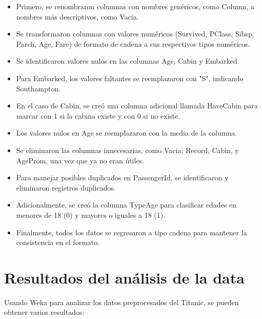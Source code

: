 \documentclass[12pt]{article}
\begin{document}
        \begin{itemize}
            \item Primero, se renombraron columnas con nombres genéricos, como Column, a nombres más descriptivos, como Vacia. 
            \item Se transformaron columnas con valores numéricos (Survived, PClass, Sibsp, Parch, Age, Fare) de formato de cadena a sus respectivos tipos numéricos. 
            \item Se identificaron valores nulos en las columnas Age, Cabin y Embarked.
            \item Para Embarked, los valores faltantes se reemplazaron con "S", indicando Southampton.
            \item En el caso de Cabin, se creó una columna adicional llamada HaveCabin para marcar con 1 si la cabina existe y con 0 si no existe. 
            \item Los valores nulos en Age se reemplazaron con la media de la columna.
            \item Se eliminaron las columnas innecesarias, como Vacia, Record, Cabin, y AgeProm, una vez que ya no eran útiles. 
            \item Para manejar posibles duplicados en PassengerId, se identificaron y eliminaron registros duplicados. 
            \item Adicionalmente, se creó la columna TypeAge para clasificar edades en menores de 18 (0) y mayores o iguales a 18 (1). 
            \item Finalmente, todos los datos se regresaron a tipo cadena para mantener la consistencia en el formato.
        \end{itemize}

    \newpage
    \section{Resultados del análisis de la data}
        Usando Weka para analizar los datos preprocesados del Titanic, se pueden obtener varios resultados:
\end{document}
